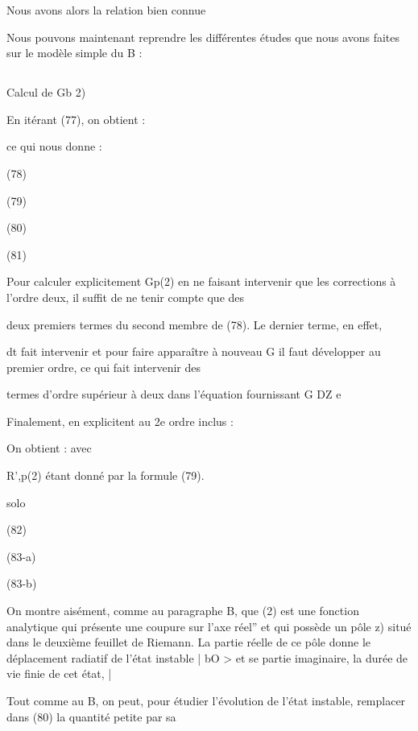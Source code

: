 Nous avons alors la relation bien connue

Nous pouvons maintenant reprendre les différentes études que
nous avons faites sur le modèle simple du  B :

\subsection{}%

\subsubsection{} Calcul de Gb 2)%

En itérant (77), on obtient :

ce qui nous donne :

(78)

(79)

(80)

(81)



Pour calculer explicitement Gp(2) en ne faisant intervenir
que les corrections à l'ordre deux, il suffit de ne tenir compte que des

deux premiers termes du second membre de (78). Le dernier terme, en effet,

dt
fait intervenir  et pour faire apparaître à nouveau G il
faut développer au premier ordre, ce qui fait intervenir des

termes d'ordre supérieur à deux dans l'équation fournissant G DZ e

Finalement, en explicitent au 2e ordre inclus :

On obtient :
 avec

R',p(2) étant donné par la formule (79).

solo

(82)

(83-a)

(83-b)

On montre aisément, comme au paragraphe B, que (2) est une
fonction analytique qui présente une coupure sur l'axe réel” et qui possède
un pôle z) situé dans le deuxième feuillet de Riemann. La partie réelle de
ce pôle donne le déplacement radiatif de l'état instable | bO > et se partie imaginaire, la durée de vie finie de cet état, |

Tout comme au  B, on peut, pour étudier l'évolution de l'état
instable, remplacer dans (80) la quantité petite  par sa

